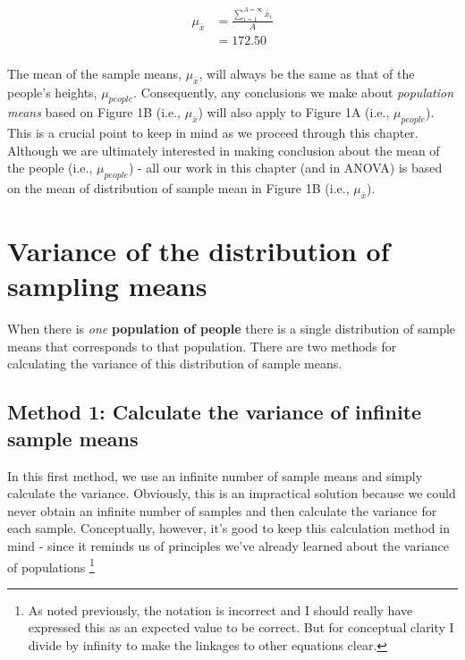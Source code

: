 \documentclass[
]{krantz}
\begin{document}
\[
\begin{aligned} 
\mu_{\bar{x}} &= \frac{\sum_{i=1}^{A=\infty}{\bar{x}_i}}{A}\\
&= 172.50\\
\end{aligned} 
\]

The mean of the sample means, \(\mu_{\bar{x}}\), will always be the same as that of the people's heights, \(\mu_{people}\). Consequently, any conclusions we make about \emph{population means} based on Figure 1B (i.e., \(\mu_{\bar{x}}\)) will also apply to Figure 1A (i.e., \(\mu_{people}\)). This is a crucial point to keep in mind as we proceed through this chapter. Although we are ultimately interested in making conclusion about the mean of the people (i.e., \(\mu_{people}\)) - all our work in this chapter (and in ANOVA) is based on the mean of distribution of sample mean in Figure 1B (i.e., \(\mu_{\bar{x}}\)).

\hypertarget{variance-of-the-distribution-of-sampling-means}{%
\section{Variance of the distribution of sampling means}\label{variance-of-the-distribution-of-sampling-means}}

When there is \emph{one} \textbf{population of people} there is a single distribution of sample means that corresponds to that population. There are two methods for calculating the variance of this distribution of sample means.

\hypertarget{method-1-calculate-the-variance-of-infinite-sample-means}{%
\subsection{Method 1: Calculate the variance of infinite sample means}\label{method-1-calculate-the-variance-of-infinite-sample-means}}

In this first method, we use an infinite number of sample means and simply calculate the variance. Obviously, this is an impractical solution because we could never obtain an infinite number of samples and then calculate the variance for each sample. Conceptually, however, it's good to keep this calculation method in mind - since it reminds us of principles we've already learned about the variance of populations \footnote{As noted previously, the notation is incorrect and I should really have expressed this as an expected value to be correct. But for conceptual clarity I divide by infinity to make the linkages to other equations clear.}
\end{document}
